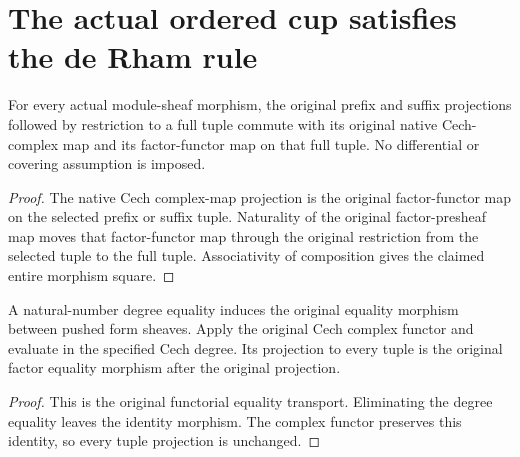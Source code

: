 \section{The actual ordered cup satisfies the de Rham rule}

\begin{theorem}
\label{thm:di-cech-cup-projections-naturality}
\leanok
{}
For every actual module-sheaf morphism, the original prefix and suffix
projections followed by restriction to a full tuple commute with its
original native Cech-complex map and its factor-functor map on that
full tuple. No differential or covering assumption is imposed.
\end{theorem}
\begin{proof}
\leanok
The native Cech complex-map projection is the original factor-functor
map on the selected prefix or suffix tuple. Naturality of the original
factor-presheaf map moves that factor-functor map through the original
restriction from the selected tuple to the full tuple. Associativity
of composition gives the claimed entire morphism square.
\end{proof}

\begin{definition}
\label{def:di-cech-cup-form-degree-map}
\leanok
{}
A natural-number degree equality induces the original equality
morphism between pushed form sheaves. Apply the original Cech
complex functor and evaluate in the specified Cech degree. Its
projection to every tuple is the original factor equality morphism
after the original projection.
\end{definition}
\begin{proof}
\leanok
This is the original functorial equality transport. Eliminating the
degree equality leaves the identity morphism. The complex functor
preserves this identity, so every tuple projection is unchanged.
\end{proof}

